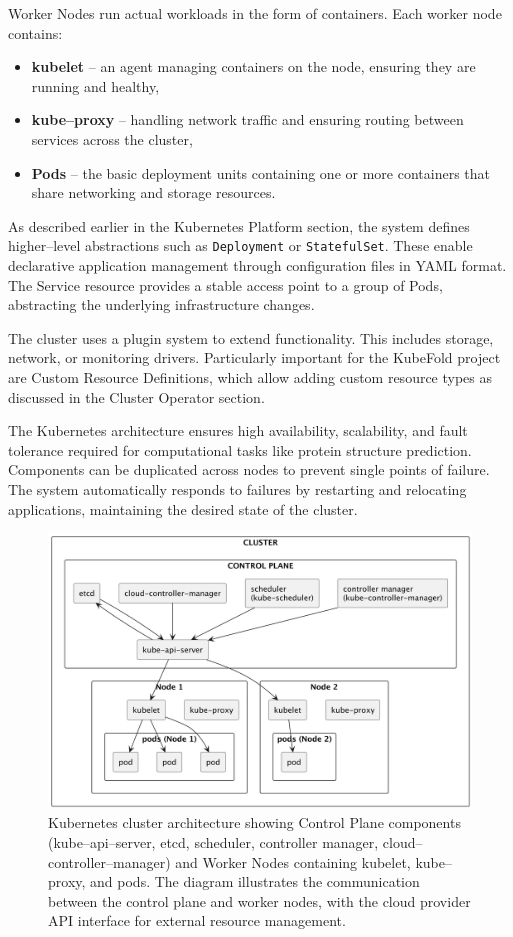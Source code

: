 Worker Nodes run actual workloads in the form of containers.
Each worker node contains:
\begin{itemize}
    \item \textbf{kubelet} -- an agent managing containers on the node, ensuring they are running and healthy,
    \item \textbf{kube--proxy} -- handling network traffic and ensuring routing between services across the cluster,
    \item \textbf{Pods} -- the basic deployment units containing one or more containers that share networking and storage resources.
\end{itemize}

As described earlier in the Kubernetes Platform section, the system defines higher--level abstractions such as \texttt{Deployment} or \texttt{StatefulSet}.
These enable declarative application management through configuration files in YAML format.
The Service resource provides a stable access point to a group of Pods, abstracting the underlying infrastructure changes.

The cluster uses a plugin system to extend functionality.
This includes storage, network, or monitoring drivers.
Particularly important for the KubeFold project are Custom Resource Definitions, which allow adding custom resource types as discussed in the Cluster Operator section.

The Kubernetes architecture ensures high availability, scalability, and fault tolerance required for computational tasks like protein structure prediction.
Components can be duplicated across nodes to prevent single points of failure.
The system automatically responds to failures by restarting and relocating applications, maintaining the desired state of the cluster.

\begin{figure}[htbp]
    \centering
    \includegraphics[width=\textwidth]{images/kubernetes}
    \caption{Kubernetes cluster architecture showing Control Plane components (kube--api--server, etcd, scheduler, controller manager, cloud--controller--manager) and Worker Nodes containing kubelet, kube--proxy, and pods. The diagram illustrates the communication between the control plane and worker nodes, with the cloud provider API interface for external resource management.}
    \label{fig:kubernetes-architecture}
\end{figure}

